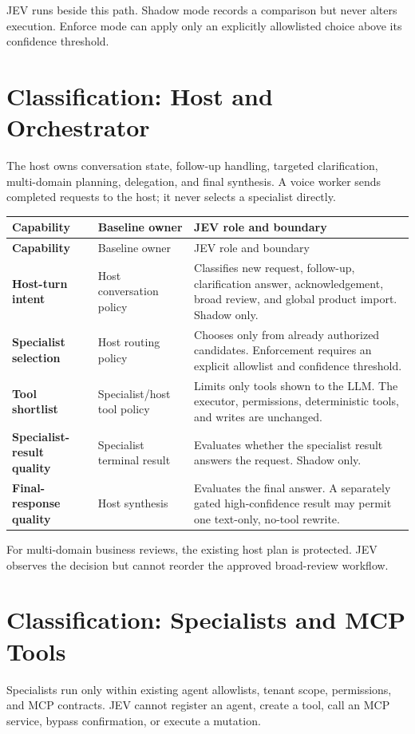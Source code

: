 \documentclass[10pt]{article}
\begin{document}
JEV runs beside this path. Shadow mode records a comparison but never alters execution. Enforce mode can apply only an explicitly allowlisted choice above its confidence threshold.

\section{Classification: Host and Orchestrator}
The host owns conversation state, follow-up handling, targeted clarification, multi-domain planning, delegation, and final synthesis. A voice worker sends completed requests to the host; it never selects a specialist directly.

\small
\begin{longtable}{@{}>{\bfseries\color{navy}}p{}@{\hspace{0.6em}}p{}@{\hspace{0.6em}}p{}@{}}
\toprule
Capability & Baseline owner & JEV role and boundary \\
\midrule
\endfirsthead
\toprule
Capability & Baseline owner & JEV role and boundary \\
\midrule
\endhead
Host-turn intent & Host conversation policy & Classifies new request, follow-up, clarification answer, acknowledgement, broad review, and global product import. Shadow only. \\
Specialist selection & Host routing policy & Chooses only from already authorized candidates. Enforcement requires an explicit allowlist and confidence threshold. \\
Tool shortlist & Specialist/host tool policy & Limits only tools shown to the LLM. The executor, permissions, deterministic tools, and writes are unchanged. \\
Specialist-result quality & Specialist terminal result & Evaluates whether the specialist result answers the request. Shadow only. \\
Final-response quality & Host synthesis & Evaluates the final answer. A separately gated high-confidence result may permit one text-only, no-tool rewrite. \\
\bottomrule
\end{longtable}
\normalsize

For multi-domain business reviews, the existing host plan is protected. JEV observes the decision but cannot reorder the approved broad-review workflow.

\section{Classification: Specialists and MCP Tools}
Specialists run only within existing agent allowlists, tenant scope, permissions, and MCP contracts. JEV cannot register an agent, create a tool, call an MCP service, bypass confirmation, or execute a mutation.
\end{document}
